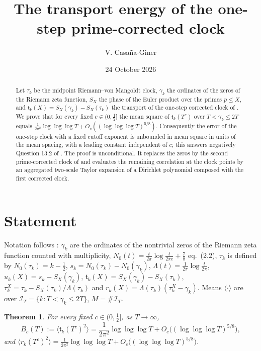 \documentclass[11pt,reqno]{amsart}
\makeatletter
\let\CG@origcite\cite
\renewcommand*{\cite}[2][]{\def\CG@citekey{#2}%
  \ifx\relax#1\relax\CG@origcite{#2}\else\CG@origcite[#1]{#2}\fi}
\numberwithin{equation}{section}
\theoremstyle{plain}
\newtheorem{theorem}{Theorem}[section]
\theoremstyle{definition}
\theoremstyle{remark}
\newcommand{\IT}{\mathcal I_T}
\makeatother
\begin{document}
\title{The transport energy of the one-step prime-corrected clock}
\author{V. Casa\~na-Giner}
\date{24 October 2026}

\begin{abstract}
Let $\tau_k$ be the midpoint Riemann--von Mangoldt clock, $\gamma_k$ the ordinates of the zeros of the Riemann zeta function, $S_X$ the phase of the Euler product over the primes $p\le X$, and $\mathfrak t_k(X)=S_X(\gamma_k)-S_X(\tau_k)$ the transport of the one-step corrected clock of \cite{PaperI}. We prove that for every fixed $c\in(0,\frac12]$ the mean square of $\mathfrak t_k(T^c)$ over $T<\gamma_k\le2T$ equals $\frac1{2\pi^2}\log\log\log T+O_c((\log\log\log T)^{5/8})$. Consequently the error of the one-step clock with a fixed cutoff exponent is unbounded in mean square in units of the mean spacing, with a leading constant independent of $c$; this answers negatively Question 13.2 of \cite{PaperI}. The proof is unconditional. It replaces the zeros by the second prime-corrected clock of \cite{PaperI} and evaluates the remaining correlation at the clock points by an aggregated two-scale Taylor expansion of a Dirichlet polynomial composed with the first corrected clock.
\end{abstract}

\maketitle
\tableofcontents

\section{Statement}\label{sec:intro}

Notation follows \cite{PaperI}: $\gamma_k$ are the ordinates of the nontrivial zeros of the Riemann zeta function counted with multiplicity, $N_0(t)=\frac t{2\pi}\log\frac t{2\pi e}+\frac78$ \cite[eq.~(2.2)]{PaperI}, $\tau_k$ is defined by $N_0(\tau_k)=k-\frac12$, $s_k=N_0(\tau_k)-N_0(\gamma_k)$, $\Lambda(t)=\frac1{2\pi}\log\frac t{2\pi}$, $u_k(X)=s_k-S_X(\gamma_k)$, $\mathfrak t_k(X)=S_X(\gamma_k)-S_X(\tau_k)$, $\tau_k^X=\tau_k-S_X(\tau_k)/\Lambda(\tau_k)$ and $r_k(X)=\Lambda(\tau_k)(\tau^X_k-\gamma_k)$. Means $\langle\cdot\rangle$ are over $\IT=\{k:T<\gamma_k\le2T\}$, $M=\#\IT$.

\begin{theorem}\label{thm:main}
For every fixed $c\in(0,\frac12]$, as $T\to\infty$,
\begin{equation}
B_c(T):=\bigl\langle\mathfrak t_k(T^c)^2\bigr\rangle=\frac1{2\pi^2}\log\log\log T+O_c\bigl((\log\log\log T)^{5/8}\bigr),
\label{eq:thm}
\end{equation}
and $\langle r_k(T^c)^2\rangle=\frac1{2\pi^2}\log\log\log T+O_c\bigl((\log\log\log T)^{5/8}\bigr)$.
\end{theorem}
\end{document}
